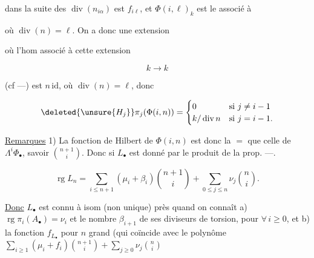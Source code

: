 
dans la suite des $\operatorname{div}(n_{i\alpha})$ est $f_{i\ell}$, et $\Phi(i,\ell)_k$ est le   associé à


où $\operatorname{div}(n)=\ell$. On a donc une extension


où l'hom associé à cette extension

\[ k\longrightarrow k \]

(cf ---) est $n\,\mathrm{id}$, où $\operatorname{div}(n)=\ell$, donc

\[
\deleted{\unsure{H_j}}\pi_j(\Phi(i,n))=
\begin{cases}0&\text{si }j\ne i-1\\
k/\operatorname{div}n&\text{si }j=i-1.
\end{cases}
\]

\uline{Remarques} 1) La fonction de Hilbert de $\Phi(i,n)$ est donc la $=$ que celle de $\Lambda^i\Phi_{\bullet}$, savoir $\binom{n+1}{i}$. Donc si $L_{\bullet}$ est donné par le produit de la prop. ---.

\[
\operatorname{rg}L_n=\sum_{i\leq n+1}(\mu_i+\beta_i)\binom{n+1}{i}
+\sum_{0\leq j\leq n}\nu_j\binom{n}{i}.
\]

\uline{Donc}  $L_{\bullet}$  est  connu à isom (non unique) près quand on connaît a) $\operatorname{rg}\pi_i(A_{\bullet})=\nu_i$ et le nombre $\beta_{i+1}$ de ses diviseurs de torsion, pour $\forall\,i\geq0$, et b) la fonction $f_{L_{\bullet}}$  pour $n$ grand (qui coïncide  avec  le polynôme $\sum_{i\geq1}(\mu_i+f_i)\binom{n+1}{i}+\sum_{j\geq0}\nu_j\binom{n}{i}$

